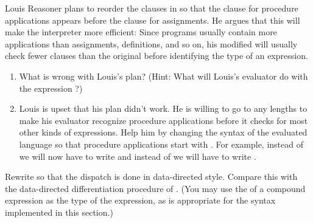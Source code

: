 \begin{exercise}
	\label{Exercise 4.2}
	Louis Reasoner plans to reorder the  clauses in  so that the clause for procedure applications appears before the clause for assignments.
	He argues that this will make the interpreter more efficient:
	Since programs usually contain more applications than assignments, definitions, and so on, his modified  will usually check fewer clauses than the original  before identifying the type of an expression.
	\begin{enumerate}[label=\alph*., leftmargin = *]

		\item
			What is wrong with Louis’s plan?
			(Hint: What will Louis’s evaluator do with the expression ?)

		\item
			Louis is upset that his plan didn’t work.
			He is willing to go to any lengths to make his evaluator recognize procedure applications before it checks for most other kinds of expressions.
			Help him by changing the syntax of the evaluated language so that procedure applications start with .
			For example, instead of  we will now have to write  and instead of  we will have to write .

	\end{enumerate}
\end{exercise}



\begin{exercise}
	\label{Exercise 4.3}
	Rewrite  so that the dispatch is done in data-directed style.
	Compare this with the data-directed differentiation procedure of .
	(You may use the  of a compound expression as the type of the expression, as is appropriate for the syntax implemented in this section.)
\end{exercise}



